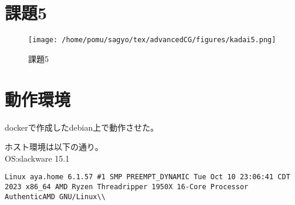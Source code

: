 \documentclass[dvipdfmx]{jsarticle}
\begin{document}
\section*{課題5}


\begin{figure}[H]
 \begin{center}
  \texttt{[image: /home/pomu/sagyo/tex/advancedCG/figures/kadai5.png]}
 \end{center}
 \caption{課題5}
 \label{fig:kadai1}
\end{figure}

\section*{動作環境}
dockerで作成したdebian上で動作させた。


ホスト環境は以下の通り。\\
OS:slackware 15.1\\
\begin{lstlisting}[caption=uname -aの実行結果]
Linux aya.home 6.1.57 #1 SMP PREEMPT_DYNAMIC Tue Oct 10 23:06:41 CDT 2023 x86_64 AMD Ryzen Threadripper 1950X 16-Core Processor AuthenticAMD GNU/Linux\\
\end{lstlisting}
\end{document}
